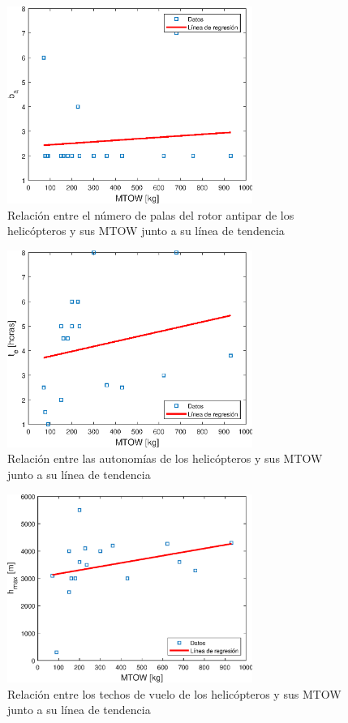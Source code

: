 \begin{figure}
	\centering
	\includegraphics[width=80mm]{graficos/analbtr}
	\caption{Relación entre el número de palas del rotor antipar de los helicópteros y sus MTOW junto a su línea de tendencia}
	\label{baAS}
\end{figure}
\begin{figure}
	\centering
	\includegraphics[width=80mm]{graficos/analaut}
	\caption{Relación entre las autonomías de los helicópteros y sus MTOW junto a su línea de tendencia}
	\label{autAS}
\end{figure}
\begin{figure}
	\centering
	\includegraphics[width=80mm]{graficos/analtecho}
	\caption{Relación entre los techos de vuelo de los helicópteros y sus MTOW junto a su línea de tendencia}
	\label{techoAS}
\end{figure}
